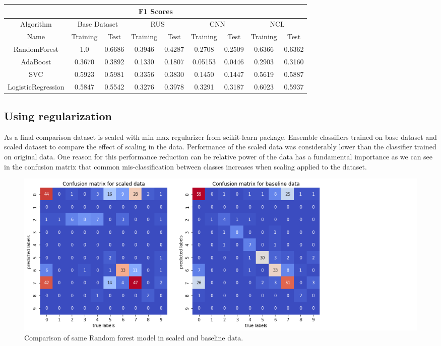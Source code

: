 \documentclass[12pt]{article}
\begin{document}
\begin{center}
    \begin{tabular}{||c c c c c c c c c||} 
    \hline
    \multicolumn{9}{||c||}{F1 Scores} \\
    \hline
    Algorithm & \multicolumn{2}{c}{Base Dataset} & \multicolumn{2}{c}{RUS} & \multicolumn{2}{c}{CNN} & \multicolumn{2}{c||}{NCL}\\
    Name & Training & Test & Training & Test & Training & Test & Training & Test\\ [0.5ex] 
    \hline\hline
    RandomForest & 1.0 & 0.6686 & 0.3946 & 0.4287 & 0.2708 & 0.2509 & 0.6366 & 0.6362\\ 
    \hline
    AdaBoost & 0.3670 & 0.3892 & 0.1330 & 0.1807 & 0.05153 & 0.0446 & 0.2903 & 0.3160\\ 
    \hline
    SVC & 0.5923 & 0.5981 & 0.3356 & 0.3830 & 0.1450 & 0.1447 & 0.5619 & 0.5887\\ 
    \hline
    LogisticRegression & 0.5847 & 0.5542 & 0.3276 & 0.3978 & 0.3291 & 0.3187 & 0.6023 & 0.5937\\ [1ex] 
    \hline
   \end{tabular}
\end{center}

\subsection{Using regularization} \label{subse:scalingdata}

As a final comparison dataset is scaled with min max regularizer from scikit-learn \cite{scikit-learn} package. Ensemble classifiers trained on base dataset and scaled dataset to compare the effect of scaling in the data. Performance of the scaled data was considerably lower than the classifier trained on original data. One reason for this performance reduction can be relative power of the data has a fundamental importance as we can see in the confusion matrix that common mis-classification between classes increases when scaling applied to the dataset.

\begin{figure}[H] \label{fig:scalecomp}
    \centering
    \includegraphics[width=\textwidth]{img/confusioncompare.png}
    \caption{Comparison of same Random forest model in scaled and baseline data.}
\end{figure}
\end{document}
